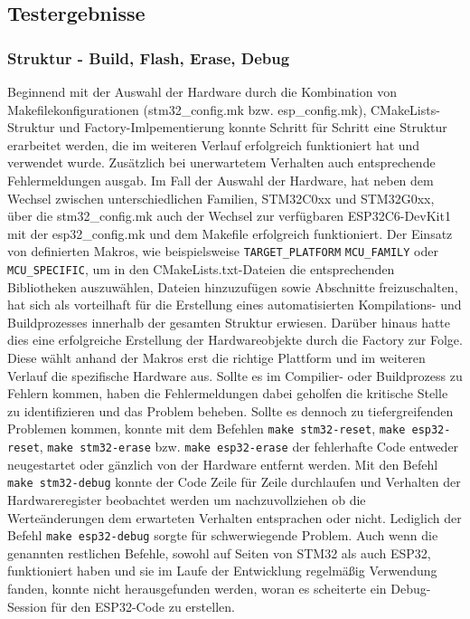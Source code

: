 \subsection*{Testergebnisse}
\subsubsection{Struktur - Build, Flash, Erase, Debug}
Beginnend mit der Auswahl der Hardware durch die Kombination von Makefilekonfigurationen (stm32\_config.mk bzw. esp\_config.mk), CMakeLists-Struktur und Factory-Imlpementierung konnte Schritt für Schritt eine Struktur erarbeitet werden, die im weiteren Verlauf erfolgreich funktioniert hat und verwendet wurde.
Zusätzlich bei unerwartetem Verhalten auch entsprechende Fehlermeldungen ausgab.
Im Fall der Auswahl der Hardware, hat neben dem Wechsel zwischen unterschiedlichen Familien, STM32C0xx und STM32G0xx, über die stm32\_config.mk auch der Wechsel zur verfügbaren ESP32C6-DevKit1 mit der esp32\_config.mk und dem Makefile erfolgreich funktioniert.
Der Einsatz von definierten Makros, wie beispielsweise \texttt{TARGET\_PLATFORM} \texttt{MCU\_FAMILY} oder \texttt{MCU\_SPECIFIC}, um in den CMakeLists.txt-Dateien die entsprechenden Bibliotheken auszuwählen, Dateien hinzuzufügen sowie Abschnitte freizuschalten, hat sich als vorteilhaft für die Erstellung eines automatisierten Kompilations- und Buildprozesses innerhalb der gesamten Struktur erwiesen.
Darüber hinaus hatte dies eine erfolgreiche Erstellung der Hardwareobjekte durch die Factory zur Folge.
Diese wählt anhand der Makros erst die richtige Plattform und im weiteren Verlauf die spezifische Hardware aus.
Sollte es im Compilier- oder Buildprozess zu Fehlern kommen, haben die Fehlermeldungen dabei geholfen die kritische Stelle zu identifizieren und das Problem beheben.
Sollte es dennoch zu tiefergreifenden Problemen kommen, konnte mit dem Befehlen \texttt{make stm32-reset}, \texttt{make esp32-reset}, \texttt{make stm32-erase} bzw. \texttt{make esp32-erase} der fehlerhafte Code entweder neugestartet oder gänzlich von der Hardware entfernt werden.
Mit den Befehl \texttt{make stm32-debug} konnte der Code Zeile für Zeile durchlaufen und Verhalten der Hardwareregister beobachtet werden um nachzuvollziehen ob die Werteänderungen dem erwarteten Verhalten entsprachen oder nicht.
Lediglich der Befehl \texttt{make esp32-debug} sorgte für schwerwiegende Problem. 
Auch wenn die genannten restlichen Befehle, sowohl auf Seiten von STM32 als auch ESP32, funktioniert haben und sie im Laufe der Entwicklung regelmäßig Verwendung fanden, konnte nicht herausgefunden werden, woran es scheiterte ein Debug-Session für den ESP32-Code zu erstellen.

